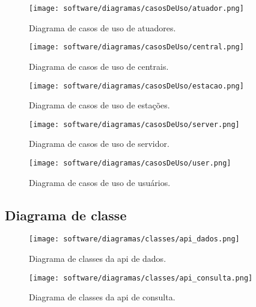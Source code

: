     \begin{figure}[H]
    	\centering
        \texttt{[image: software/diagramas/casosDeUso/atuador.png]}
        \caption{Diagrama de casos de uso de atuadores.}
        \label{fig:atuador}
    \end{figure}
    
    \begin{figure}[H]
        \texttt{[image: software/diagramas/casosDeUso/central.png]}
        \caption{Diagrama de casos de uso de centrais.}
        \label{fig:central}
    \end{figure}

    \begin{figure}[H]
        \texttt{[image: software/diagramas/casosDeUso/estacao.png]}
        \caption{Diagrama de casos de uso de estações.}
        \label{fig:estacao}
    \end{figure}

    \begin{figure}[H]
    	\centering
        \texttt{[image: software/diagramas/casosDeUso/server.png]}
        \caption{Diagrama de casos de uso de servidor.}
        \label{fig:server}
    \end{figure}

    \begin{figure}[H]
        \texttt{[image: software/diagramas/casosDeUso/user.png]}
        \caption{Diagrama de casos de uso de usuários.}
        \label{fig:user}
    \end{figure}
    

    \subsection{Diagrama de classe}
        
    \begin{figure}[H]
        \texttt{[image: software/diagramas/classes/api\_dados.png]}
        \caption{Diagrama de classes da api de dados.}
        \label{fig:classes_dados}
    \end{figure}

    \begin{figure}[H]
        \texttt{[image: software/diagramas/classes/api\_consulta.png]}
        \caption{Diagrama de classes da api de consulta.}
        \label{fig:classes_consulta}
    \end{figure}


